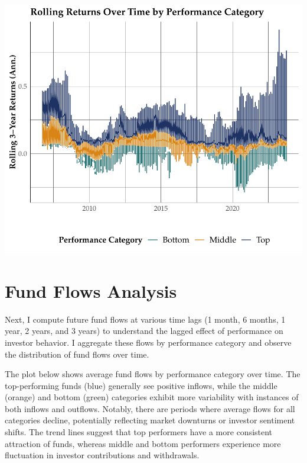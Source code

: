 \documentclass[11pt,preprint, authoryear]{elsarticle}
\numberwithin{equation}{section}
\numberwithin{figure}{section}
\numberwithin{table}{section}
\begin{document}
\includegraphics{Question-4_files/figure-latex/unnamed-chunk-1-1.pdf}

\hypertarget{fund-flows-analysis}{%
\section{Fund Flows Analysis}\label{fund-flows-analysis}}

Next, I compute future fund flows at various time lags (1 month, 6
months, 1 year, 2 years, and 3 years) to understand the lagged effect of
performance on investor behavior. I aggregate these flows by performance
category and observe the distribution of fund flows over time.

The plot below shows average fund flows by performance category over
time. The top-performing funds (blue) generally see positive inflows,
while the middle (orange) and bottom (green) categories exhibit more
variability with instances of both inflows and outflows. Notably, there
are periods where average flows for all categories decline, potentially
reflecting market downturns or investor sentiment shifts. The trend
lines suggest that top performers have a more consistent attraction of
funds, whereas middle and bottom performers experience more fluctuation
in investor contributions and withdrawals.
\end{document}
